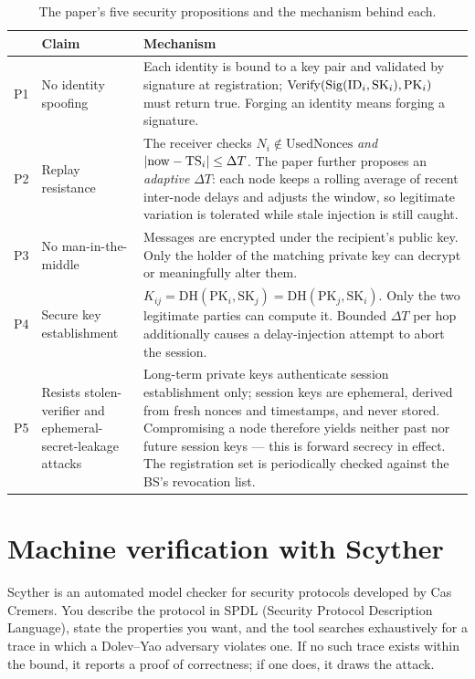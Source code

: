 \begin{table}[H]
\centering
\caption{The paper's five security propositions and the mechanism behind each.}
\label{tab:props}
\small
\begin{tabularx}{\textwidth}{@{}L{8mm} L{34mm} X@{}}
\toprule
& \textbf{Claim} & \textbf{Mechanism}\\
\midrule
P1 & No identity spoofing &
  Each identity is bound to a key pair and validated by signature at registration;
  $\mathrm{Verify}(\mathrm{Sig}(\mathrm{ID}_i,\mathrm{SK}_i),\mathrm{PK}_i)$ must return true.
  Forging an identity means forging a signature.\\
\addlinespace[2pt]
P2 & Replay resistance &
  The receiver checks $N_i \notin \mathrm{UsedNonces}$ \emph{and}
  $|\mathrm{now}-\mathrm{TS}_i| \le \Delta T$. The paper further proposes an \emph{adaptive}
  $\Delta T$: each node keeps a rolling average of recent inter-node delays and adjusts the
  window, so legitimate variation is tolerated while stale injection is still caught.\\
\addlinespace[2pt]
P3 & No man-in-the-middle &
  Messages are encrypted under the recipient's public key. Only the holder of the matching
  private key can decrypt or meaningfully alter them.\\
\addlinespace[2pt]
P4 & Secure key establishment &
  $K_{ij} = \mathrm{DH}(\mathrm{PK}_i,\mathrm{SK}_j) = \mathrm{DH}(\mathrm{PK}_j,\mathrm{SK}_i)$.
  Only the two legitimate parties can compute it. Bounded $\Delta T$ per hop additionally
  causes a delay-injection attempt to abort the session.\\
\addlinespace[2pt]
P5 & Resists stolen-verifier and ephemeral-secret-leakage attacks &
  Long-term private keys authenticate session establishment only; session keys are
  ephemeral, derived from fresh nonces and timestamps, and never stored. Compromising a node
  therefore yields neither past nor future session keys --- this is forward secrecy in
  effect. The registration set is periodically checked against the BS's revocation list.\\
\bottomrule
\end{tabularx}
\end{table}

\section{Machine verification with Scyther}

Scyther \cite{scyther} is an automated model checker for security protocols developed by
Cas Cremers. You describe the protocol in SPDL (Security Protocol Description Language),
state the properties you want, and the tool searches exhaustively for a trace in which a
Dolev--Yao adversary violates one. If no such trace exists within the bound, it reports a
proof of correctness; if one does, it draws the attack.

